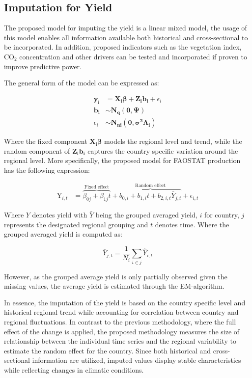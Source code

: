 \documentclass[nojss]{jss}\usepackage{graphicx, color}
\begin{document}
\subsection{Imputation for Yield}
The proposed model for imputing the yield is a linear mixed model, the
usage of this model enables all information available both
historical and cross-sectional to be incorporated. In addition,
proposed indicators such as the vegetation index, $\text{CO}_2$
concentration and other drivers can be tested and incorporated if
proven to improve predictive power.

The general form of the model can be expressed as:

\begin{align}
  \mathbf{y_i} &= \mathbf{X_i}\boldsymbol{\beta} +
  \mathbf{Z_i}\mathbf{b_i} + \epsilon_i \nonumber\\
  \mathbf{b_i} &\sim \mathbf{N_q}(\mathbf{0}, \boldsymbol{\Psi})\nonumber\\
  \epsilon_i &\sim \mathbf{N_{ni}}(\mathbf{0},
  \boldsymbol{\sigma^2}\boldsymbol{\Lambda_i})
\end{align}

Where the fixed component $\mathbf{X_i}\boldsymbol{\beta}$ models the
regional level and trend, while the random component of
$\mathbf{Z_i}\mathbf{b_i}$ captures the country specific variation
around the regional level.  More specifically, the proposed model for
FAOSTAT production has the following expression:

\begin{align}
  \label{eq:lmeImpute}
  \text{Y}_{i,t} &= \overbrace{\beta_{0j} + \beta_{1j}t}^{\text{Fixed
      effect}} + \overbrace{b_{0,i} + b_{1,i}t +
    b_{2,i, t}\bar{Y}_{j,t}}^{\text{Random effect}} + \epsilon_{i,t}
\end{align}

Where $Y$ denotes yield with $\bar{Y}$ being the grouped averaged
yield, $i$ for country, $j$ represents the designated regional
grouping and $t$ denotes time. Where the grouped averaged yield is
computed as:

\begin{equation}
  \label{eq:averageYield}
  \bar{Y}_{j, t} = \frac{1}{N_i}\sum_{i \in j} \hat{Y}_{i,t}
\end{equation}

However, as the grouped average yield is only partially observed
given the missing values, the average yield is estimated through the
EM-algorithm.


In essence, the imputation of the yield is based on the country
specific level and historical regional trend while accounting for
correlation between country and regional fluctuations. In contrast to
the previous methodology, where the full effect of the change is
applied, the proposed methodology measures the size of relationship
between the individual time series and the regional variability to
estimate the random effect for the country. Since both historical and
cross-sectional information are utilized, imputed values display
stable characteristics while reflecting changes in climatic
conditions.
\end{document}
